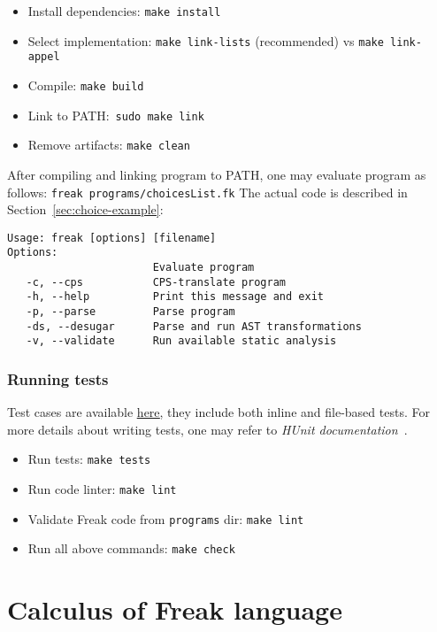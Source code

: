 \documentclass[declaration,shortabstract]{iithesis}
\theoremstyle{definition} \newtheorem{definition}{Definition}[chapter]
\theoremstyle{remark} \newtheorem{remark}[definition]{Observation}
\theoremstyle{plain} \newtheorem{theorem}[definition]{Theorem}
\theoremstyle{plain} \newtheorem{lemma}[definition]{Lemma}
\begin{document}
    \begin{itemize}
        \item Install dependencies: \verb!make install!
        \item Select implementation: \verb!make link-lists! (recommended) vs \verb!make link-appel!
        \item Compile: \verb!make build!
        \item Link to PATH:~\verb!sudo make link!
        \item Remove artifacts: \verb!make clean!
    \end{itemize}

    After compiling and linking program to PATH, one may evaluate program as
    follows: \verb!freak programs/choicesList.fk! The actual code is described
    in Section~\ref{sec:choice-example}:

\begin{verbatim}
Usage: freak [options] [filename]
Options:
                       Evaluate program
   -c, --cps           CPS-translate program
   -h, --help          Print this message and exit
   -p, --parse         Parse program
   -ds, --desugar      Parse and run AST transformations
   -v, --validate      Run available static analysis
\end{verbatim}

    \subsection{Running tests}

    Test cases are available \href{https://github.com/Tomatosoup97/freak/blob/master/src/Tests.hs}{\underline{here}},
    they include both inline and file-based tests. For more details about
    writing tests, one may refer to \textit{HUnit documentation}~\cite{hunit-docs}.

    \begin{itemize}
        \item Run tests: \verb!make tests!
        \item Run code linter: \verb!make lint!
        \item Validate Freak code from \verb!programs! dir: \verb!make lint!
        \item Run all above commands: \verb!make check!
    \end{itemize}

\chapter{Calculus of Freak language}\label{chapter:calculus-of-freak-language}
\end{document}
